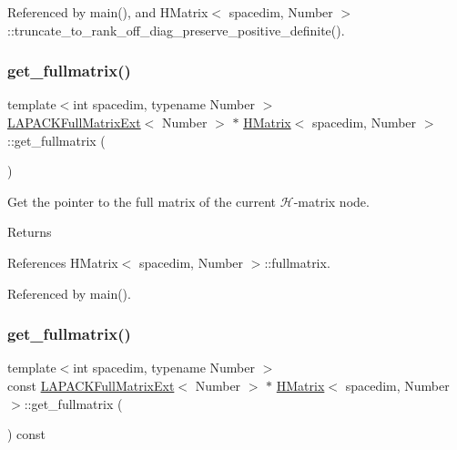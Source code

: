 Referenced by main(), and H\+Matrix$<$ spacedim, Number $>$\+::truncate\+\_\+to\+\_\+rank\+\_\+off\+\_\+diag\+\_\+preserve\+\_\+positive\+\_\+definite().

\mbox{\label{classHMatrix_a9d914c27d4e990d476a4529b2daa64cd}} 
\subsubsection{\texorpdfstring{get\+\_\+fullmatrix()}{get\_fullmatrix()}\hspace{0.1cm}{\footnotesize\ttfamily [1/2]}}
{\footnotesize\ttfamily template$<$int spacedim, typename Number $>$ \\
\hyperlink{classLAPACKFullMatrixExt}{L\+A\+P\+A\+C\+K\+Full\+Matrix\+Ext}$<$ Number $>$ $\ast$ \hyperlink{classHMatrix}{H\+Matrix}$<$ spacedim, Number $>$\+::get\+\_\+fullmatrix (\begin{DoxyParamCaption}{ }\end{DoxyParamCaption})}

Get the pointer to the full matrix of the current $\mathcal{H}$-\/matrix node. \begin{DoxyReturn}{Returns}

\end{DoxyReturn}


References H\+Matrix$<$ spacedim, Number $>$\+::fullmatrix.



Referenced by main().

\mbox{\label{classHMatrix_aed550b5b41a64c6f1bbcde4f8f7eca91}} 
\subsubsection{\texorpdfstring{get\+\_\+fullmatrix()}{get\_fullmatrix()}\hspace{0.1cm}{\footnotesize\ttfamily [2/2]}}
{\footnotesize\ttfamily template$<$int spacedim, typename Number $>$ \\
const \hyperlink{classLAPACKFullMatrixExt}{L\+A\+P\+A\+C\+K\+Full\+Matrix\+Ext}$<$ Number $>$ $\ast$ \hyperlink{classHMatrix}{H\+Matrix}$<$ spacedim, Number $>$\+::get\+\_\+fullmatrix (\begin{DoxyParamCaption}{ }\end{DoxyParamCaption}) const}

